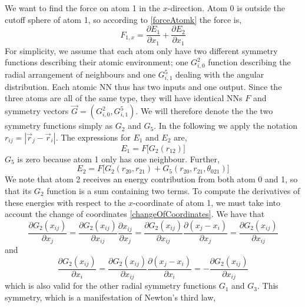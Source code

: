 \documentclass[twoside,english]{uiofysmaster}
\begin{document}
We want to find the force on atom 1 in the $x$-direction. Atom 0 is outside the cutoff sphere of atom 1, 
so according to \eqref{forceAtomk} the force is,
\begin{equation}
 F_{1,x} = \frac{\partial E_1}{\partial x_1} + \frac{\partial E_2}{\partial x_1}
 \label{forceOnAtom1}
\end{equation}
For simplicity, we assume that each atom only have two different symmetry functions describing their atomic environment;
one $G_{i,0}^2$ function describing the radial arrangement of neighbours and one $G_{i,1}^5$ dealing with the angular distribution.
Each atomic NN thus has two inputs and one output. 
Since the three atoms are all of the same type, they will have identical NNs $F$ and 
symmetry vectors $\vec{G} = (G_{i,0}^2, G_{i,1}^5)$. 
We will therefore denote the the two symmetry functions simply as $G_2$ and $G_5$. 
In the following we apply the notation $r_{ij} = |\vec{r}_j - \vec{r}_i|$. 
The expressions for $E_1$ and $E_2$ are,
\begin{equation}
 E_1 = F\bigr[G_2(r_{12})\bigr]
 \label{energyAtom1}
\end{equation}
$G_5$ is zero because atom 1 only has one neighbour. Further, 
\begin{equation}
 E_2 = F\bigr[G_2(r_{20}, r_{21}) + G_5(r_{20},r_{21},\theta_{021})\bigr]
 \label{energyAtom2}
\end{equation}
We note that atom 2 receives an energy contribution from both atom 0 and 1, so that 
its $G_2$ function is a sum containing two terms. 
To compute the derivatives of these energies with respect to the $x$-coordinate of atom 1, we
must take into account the change of coordinates \eqref{changeOfCoordinates}. We have that
\begin{equation}
 \frac{\partial G_2(x_{ij})}{\partial x_j} = \frac{\partial G_2(x_{ij})}{\partial x_{ij}}\frac{\partial x_{ij}}{\partial x_j}
 = \frac{\partial G_2(x_{ij})}{\partial x_{ij}}\frac{\partial (x_j-x_i)}{\partial x_j} = 
 \frac{\partial G_2(x_{ij})}{\partial x_{ij}}
 \label{changeOfCoordsSymmetry1}
\end{equation}
and
\begin{equation}
 \frac{\partial G_2(x_{ij})}{\partial x_i} = \frac{\partial G_2(x_{ij})}{\partial x_{ij}}\frac{\partial (x_j-x_i)}{\partial x_i} =
 -\frac{\partial G_2(x_{ij})}{\partial x_{ij}}
 \label{changeOfCoordsSymmetry2}
\end{equation}
which is also valid for the other radial symmetry functions $G_1$ and $G_3$.   
This symmetry, which is a manifestation of Newton's third law,
\end{document}
